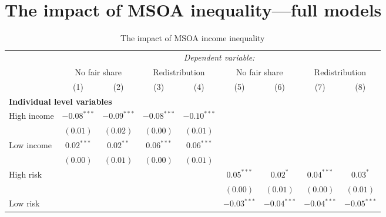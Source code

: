 \documentclass[12pt, letter]{scrartcl}
\begin{document}
\singlespacing

\section{The impact of MSOA inequality---full models}
\label{appendix:msoafull}


\begin{tiny}
\setlength{\tabcolsep}{0.2em}
\begin{longtable}{lcccccccc}
\caption[The impact of MSOA income inequality]{The impact of MSOA income inequality}\\
& \multicolumn{8}{c}{\textit{Dependent variable:}} \\[5pt]
& \multicolumn{2}{c}{No fair share} & \multicolumn{2}{c}{Redistribution} & \multicolumn{2}{c}{No fair share} & \multicolumn{2}{c}{Redistribution} \\
& (1) & (2) & (3) & (4) & (5) & (6) & (7) & (8) \\ 
\toprule[1pt]
\multicolumn{9}{l}{\textbf{Individual level variables}} \\[5pt]
High income                                 & $-0.08^{***}$ & $-0.09^{***}$ & $-0.08^{***}$ & $-0.10^{***}$ &               &               &               &               \\
                                            & $(0.01)$      & $(0.02)$      & $(0.00)$      & $(0.01)$      &               &               &               &               \\
Low income                                  & $0.02^{***}$  & $0.02^{**}$   & $0.06^{***}$  & $0.06^{***}$  &               &               &               &               \\
                                            & $(0.00)$      & $(0.01)$      & $(0.00)$      & $(0.01)$      &               &               &               &               \\
High risk                                   &               &               &               &               & $0.05^{***}$  & $0.02^{*}$    & $0.04^{***}$  & $0.03^{*}$    \\
                                            &               &               &               &               & $(0.00)$      & $(0.01)$      & $(0.00)$      & $(0.01)$      \\
Low risk                                    &               &               &               &               & $-0.03^{***}$ & $-0.04^{***}$ & $-0.04^{***}$ & $-0.05^{***}$ \\

\end{longtable}
\end{tiny}
\end{document}
